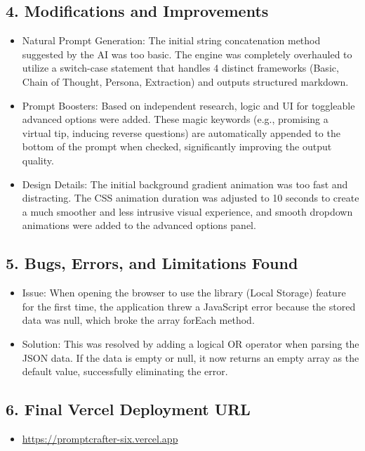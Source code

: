 \documentclass[11pt]{article}
\begin{document}
\subsection*{4. Modifications and Improvements}
\begin{itemize}[noitemsep]
    \item Natural Prompt Generation: The initial string concatenation method suggested by the AI was too basic. The engine was completely overhauled to utilize a switch-case statement that handles 4 distinct frameworks (Basic, Chain of Thought, Persona, Extraction) and outputs structured markdown.
    \item Prompt Boosters: Based on independent research, logic and UI for toggleable advanced options were added. These magic keywords (e.g., promising a virtual tip, inducing reverse questions) are automatically appended to the bottom of the prompt when checked, significantly improving the output quality.
    \item Design Details: The initial background gradient animation was too fast and distracting. The CSS animation duration was adjusted to 10 seconds to create a much smoother and less intrusive visual experience, and smooth dropdown animations were added to the advanced options panel.
\end{itemize}

\subsection*{5. Bugs, Errors, and Limitations Found}
\begin{itemize}[noitemsep]
    \item Issue: When opening the browser to use the library (Local Storage) feature for the first time, the application threw a JavaScript error because the stored data was null, which broke the array forEach method.
    \item Solution: This was resolved by adding a logical OR operator when parsing the JSON data. If the data is empty or null, it now returns an empty array as the default value, successfully eliminating the error.
\end{itemize}

\subsection*{6. Final Vercel Deployment URL}
\begin{itemize}[noitemsep]
    \item \url{https://promptcrafter-six.vercel.app}
\end{itemize}
\end{document}
